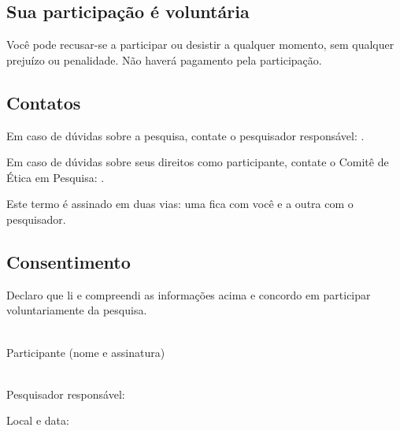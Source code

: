 \subsection*{Sua participação é voluntária}
Você pode recusar-se a participar ou desistir a qualquer momento, sem qualquer prejuízo ou penalidade. Não haverá pagamento pela participação.

\subsection*{Contatos}
Em caso de dúvidas sobre a pesquisa, contate o pesquisador responsável: \eticaContatoPesquisador.

Em caso de dúvidas sobre seus direitos como participante, contate o Comitê de Ética em Pesquisa: \eticaContatoCEP.

Este termo é assinado em duas vias: uma fica com você e a outra com o pesquisador.

\subsection*{Consentimento}
Declaro que li e compreendi as informações acima e concordo em participar voluntariamente da pesquisa.

\vspace{2.5cm}
\noindent
\begin{minipage}[t]{0.47\textwidth}
  \hrulefill\\
  Participante (nome e assinatura)
\end{minipage}\hfill
\begin{minipage}[t]{0.47\textwidth}
  \hrulefill\\
  Pesquisador responsável: \orientador
\end{minipage}

\bigskip
\noindent Local e data: \hrulefill
